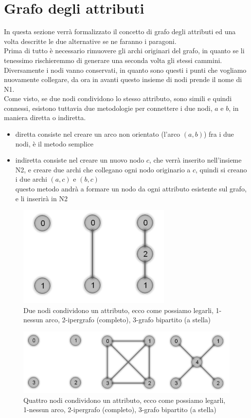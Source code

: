 \section{Grafo degli attributi}
In questa sezione verrà formalizzato il concetto di grafo degli attributi ed una volta descritte le due alternative se ne faranno i paragoni.\\
Prima di tutto è necessario rimuovere gli archi originari del grafo, in quanto se li tenessimo rischieremmo di generare una seconda volta gli stessi cammini. Diversamente i nodi vanno conservati, in quanto sono questi i punti che vogliamo nuovamente collegare, da ora in avanti questo insieme di nodi prende il nome di N1.\\
Come visto, se due nodi condividono lo stesso attributo, sono simili e quindi connessi, esistono tuttavia due metodologie per connettere i due nodi, $a$ e $b$, in maniera diretta o indiretta.
\begin{itemize}
	\item diretta consiste nel creare un arco non orientato (l'arco $(a, b)$) fra i due nodi, è il metodo semplice
	\item indiretta consiste nel creare un nuovo nodo $c$, che verrà inserito nell'insieme N2, e creare due archi che collegano ogni nodo originario a $c$, quindi si creano i due archi $(a, c)$ e $(b, c)$\\
	questo metodo andrà a formare un nodo da ogni attributo esistente sul grafo, e li inserirà in N2
\end{itemize}
%
\begin{figure}[htp]
	\centering
	\includegraphics{immagini/add_att2}
	\caption{Due nodi condividono un attributo, ecco come possiamo legarli, 1-nessun arco, 2-ipergrafo (completo), 3-grafo bipartito (a stella)}
	\label{fig:add_att2}
\end{figure}
\begin{figure}[htp]
	\centering
	\includegraphics[width=\linewidth]{immagini/add_att4}
	\caption{Quattro nodi condividono un attributo, ecco come possiamo legarli, 1-nessun arco, 2-ipergrafo (completo), 3-grafo bipartito (a stella)}
	\label{fig:add_att4}
\end{figure}
